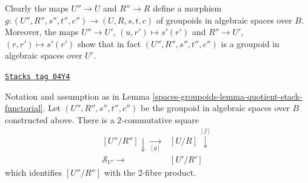 \medskip\noindent
Clearly the maps $U'' \to U$ and $R'' \to R$ define a morphism
$g : (U'', R'', s'', t'', c'') \to (U, R, s, t, c)$
of groupoids in algebraic spaces over $B$. Moreover, the maps
$U'' \to U'$, $(u, r') \mapsto s'(r')$ and
$R'' \to U'$, $(r, r') \mapsto s'(r')$ show that in fact
$(U'', R'', s'', t'', c'')$ is a groupoid in algebraic spaces over $U'$.

\begin{lemma}
\label{spaces-groupoids-lemma-cartesian-square-of-morphism}
\href{https://stacks.math.columbia.edu/tag/04Y4}{\texttt{Stacks tag 04Y4}}

Notation and assumption as in
Lemma \ref{spaces-groupoids-lemma-quotient-stack-functorial}.
Let $(U'', R'', s'', t'', c'')$ be the groupoid in algebraic spaces over $B$
constructed above.
There is a $2$-commutative square
$$
\begin{array}{cc}[U''/R''] \downarrow\underset{[g]}{\longrightarrow} & [U/R] \overset{[f]}{\downarrow} \\ \mathcal{S}_{U'} \longrightarrow & [U'/R']\end{array}
$$
which identifies $[U''/R'']$ with the $2$-fibre product.
\end{lemma}

